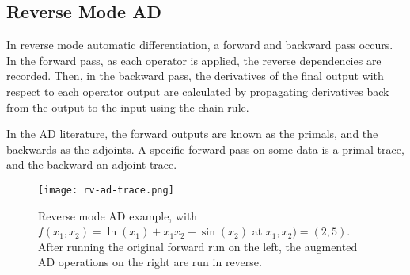 \subsection{Reverse Mode AD}
In reverse mode automatic differentiation, a forward and backward pass occurs.
In the forward pass, as each operator is applied, the reverse dependencies are recorded.
Then, in the backward pass, the derivatives of the final output with respect to each operator output are calculated by propagating derivatives back from the output to the input using the chain rule.

In the AD literature, the forward outputs are known as the primals, and the backwards as the adjoints.
A specific forward pass on some data is a primal trace, and the backward an adjoint trace.

\begin{figure}[tb]
    \centering
    \texttt{[image: rv-ad-trace.png]}
    \caption{Reverse mode AD example, with \(f(x_1, x_2) = \ln(x_1) + x_1x_2 - \sin(x_2)\) at \(x_1, x_2) = (2, 5)\). After running the original forward run on the left, the augmented AD operations on the right are run in reverse. \cite[Table~3]{Baydin2015}}
    \label{fig:2-rv-ad-trace}
\end{figure}

